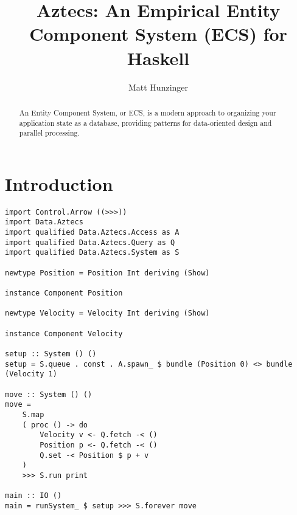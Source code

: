 \documentclass[sigplan,screen,nonacm]{acmart}
\title{Aztecs: An Empirical Entity Component System (ECS) for Haskell}
\author{Matt Hunzinger}
\begin{document}
\begin{abstract}
    An Entity Component System, or ECS,
    is a modern approach to organizing your application state as a database,
    providing patterns for data-oriented design and parallel processing.
\end{abstract}

\maketitle

\section{Introduction}
\begin{lstlisting}
import Control.Arrow ((>>>))
import Data.Aztecs
import qualified Data.Aztecs.Access as A
import qualified Data.Aztecs.Query as Q
import qualified Data.Aztecs.System as S

newtype Position = Position Int deriving (Show)

instance Component Position

newtype Velocity = Velocity Int deriving (Show)

instance Component Velocity

setup :: System () ()
setup = S.queue . const . A.spawn_ $ bundle (Position 0) <> bundle (Velocity 1)

move :: System () ()
move =
    S.map
    ( proc () -> do
        Velocity v <- Q.fetch -< ()
        Position p <- Q.fetch -< ()
        Q.set -< Position $ p + v
    )
    >>> S.run print

main :: IO ()
main = runSystem_ $ setup >>> S.forever move
\end{lstlisting}
\end{document}

